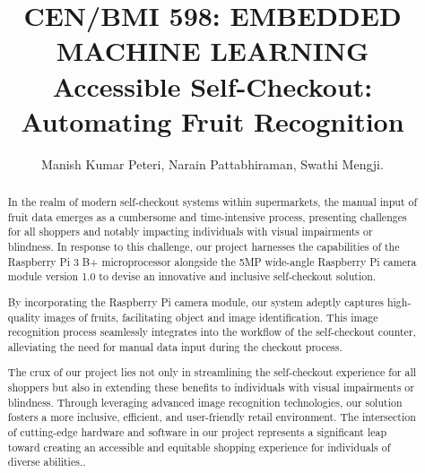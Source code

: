 \documentclass[manuscript]{aastex631}
\begin{document}

\title{\vspace{-0.5cm}\large CEN/BMI 598: EMBEDDED MACHINE LEARNING\\\vspace{0.5em}Accessible Self-Checkout: Automating Fruit Recognition}
\author{
    Manish Kumar Peteri,
    Narain Pattabhiraman,
    Swathi Mengji.
}



\begin{abstract}
\setlength{\parindent}{0pt}

In the realm of modern self-checkout systems within supermarkets, the manual input of fruit data emerges as a cumbersome and time-intensive process, presenting challenges for all shoppers and notably impacting individuals with visual impairments or blindness. In response to this challenge, our project harnesses the capabilities of the Raspberry Pi 3 B+ microprocessor alongside the 5MP wide-angle Raspberry Pi camera module version 1.0 to devise an innovative and inclusive self-checkout solution.

By incorporating the Raspberry Pi camera module, our system adeptly captures high-quality images of fruits, facilitating object and image identification. This image recognition process seamlessly integrates into the workflow of the self-checkout counter, alleviating the need for manual data input during the checkout process.

The crux of our project lies not only in streamlining the self-checkout experience for all shoppers but also in extending these benefits to individuals with visual impairments or blindness. Through leveraging advanced image recognition technologies, our solution fosters a more inclusive, efficient, and user-friendly retail environment. The intersection of cutting-edge hardware and software in our project represents a significant leap toward creating an accessible and equitable shopping experience for individuals of diverse abilities..

\vspace{200pt} 
\end{abstract}
\end{document}
